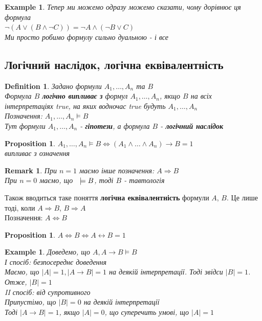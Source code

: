 \documentclass[a4paper, 14pt]{extarticle}
\theoremstyle{theoremdd}
\theoremstyle{theoremdd}
\newtheorem{definition}[theorem]{Definition}
\theoremstyle{theoremdd}
\theoremstyle{theoremdd}
\theoremstyle{theoremdd}
\newtheorem{example}[theorem]{Example}
\theoremstyle{theoremdd}
\theoremstyle{theoremdd}
\theoremstyle{theoremdd}
\theoremstyle{theoremdd}
\newtheorem{proposition}[theorem]{Proposition}
\theoremstyle{theoremdd}
\theoremstyle{theoremdd}
\newtheorem{remark}[theorem]{Remark}
\theoremstyle{theoremdd}
\theoremstyle{theoremdd}
\theoremstyle{theoremdd}
\theoremstyle{theoremdd}
\begin{document}
\begin{example} Тепер ми можемо одразу можемо сказати, чому дорівнює ця формула\\
$\neg (A \vee (B \wedge \neg C)) = \neg A \wedge (\neg B \vee C)$\\
Ми просто робимо формулу сильно дуальною - і все
\end{example}

\subsection{Логічний наслідок, логічна еквівалентність}
\begin{definition}
Задано формули $A_1,\dots,A_n$ та $B$\\
Формула $B$ \textbf{логічно випливає з} формул $A_1,\dots,A_n$, якщо $B$ на всіх інтерпретаціях true, на яких водночас true будуть $A_1,\dots,A_n$\\
Позначення: $A_1,\dots,A_n \models B$\\
Тут формули $A_1,\dots,A_n$ - \textbf{гіпотези}, а формула $B$ - \textbf{логічний наслідок}
\end{definition}

\begin{proposition}
$A_1,\dots,A_n \models B \iff (A_1 \wedge \dots \wedge A_n) \rightarrow B = 1$\\
\textit{випливає з означення}
\end{proposition}

\begin{remark}
При $n = 1$ маємо інше позначення: $A \Rightarrow B$\\
При $n = 0$ маємо, що $\hspace{0.2cm} \models B$, тоді $B$ - тавтологія
\end{remark}

Також вводиться таке поняття \textbf{логічна еквівалентність} формули $A$, $B$. Це лише тоді, коли $A \Rightarrow B$, $B \Rightarrow A$\\
Позначення: $A \Leftrightarrow B$
\begin{proposition}
$A \Leftrightarrow B \iff A \leftrightarrow B = 1$
\end{proposition}

\begin{example} Доведемо, що $A, A \rightarrow B \models B$\\
І спосіб: безпосереднє доведення\\
Маємо, що $|A| = 1, |A \rightarrow B| = 1$ на деякій інтерпретації. Тоді звідси $|B| = 1$. Отже, $|B| = 1$
\bigskip \\
II спосіб: від супротивного\\
Припустімо, що $|B| = 0$ на деякій інтерпретації\\
Тоді $|A \rightarrow B| = 1$, якщо $|A| = 0$, що суперечить умові, що $|A| = 1$
\end{example}
\end{document}
